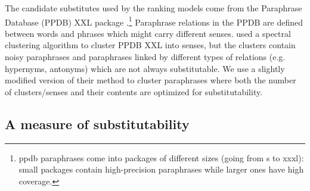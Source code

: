 \documentclass[11pt]{article}
\begin{document}
The candidate substitutes used by the ranking models come from the Paraphrase Database (PPDB) XXL package \cite{ganitkevitch-EtAl:2013:NAACL}.\footnote{{\sc ppdb} paraphrases come into packages of different sizes (going from {\sc s} to {\sc xxxl}): small packages contain high-precision paraphrases while larger ones have high coverage.} Paraphrase relations in the PPDB are defined between words and phrases which might carry different senses.  used a spectral clustering algorithm to cluster PPDB XXL into senses, but %
the clusters contain noisy paraphrases and paraphrases linked by different types of relations (e.g. hypernyms, antonyms) which are not always substitutable. We use a slightly modified version of their method to cluster paraphrases where both the number of clusters/senses and their contents are optimized for substitutability. %



\subsection{A measure of substitutability}
\label{nmi} 
\end{document}
